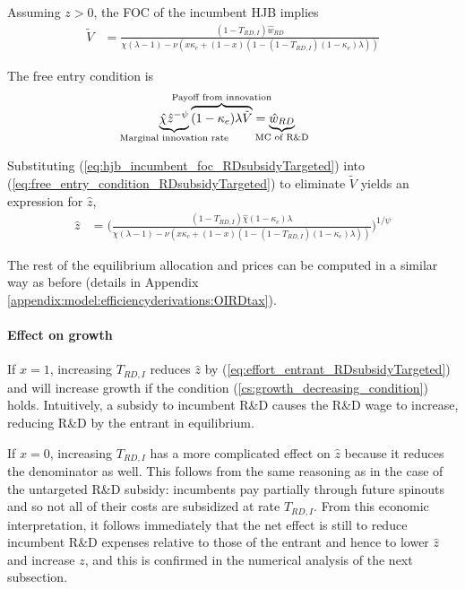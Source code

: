 \documentclass[11pt,english]{article}
\begin{document}
Assuming $z > 0$, the FOC of the incumbent HJB implies
\begin{align}
\tilde{V} &= \frac{(1-T_{RD,I})\hat{w}_{RD}}{\chi(\lambda -1) - \nu (x\kappa_c + (1-x)(1 - (1-T_{RD,I})(1-\kappa_e)\lambda)) } \label{eq:hjb_incumbent_foc_RDsubsidyTargeted}
\end{align}

The free entry condition is
\begin{align}
\underbrace{\hat{\chi} \hat{z}^{-\psi}}_{\mathclap{\text{Marginal innovation rate}}} \overbrace{(1-\kappa_e) \lambda \tilde{V}}^{\mathclap{\text{Payoff from innovation}}} &= \underbrace{\hat{w}_{RD}}_{\mathclap{\text{MC of R\&D}}} \label{eq:free_entry_condition_RDsubsidyTargeted}
\end{align}

Substituting (\ref{eq:hjb_incumbent_foc_RDsubsidyTargeted}) into (\ref{eq:free_entry_condition_RDsubsidyTargeted}) to eliminate $\tilde{V}$ yields an expression for $\hat{z}$, 
\begin{align}
\hat{z} &= \Bigg( \frac{(1-T_{RD,I})\hat{\chi} (1-\kappa_{e}) \lambda}{\chi(\lambda -1) - \nu (x\kappa_c + (1-x)(1 - (1-T_{RD,I})(1-\kappa_e)\lambda)) } \Bigg)^{1/\psi} \label{eq:effort_entrant_RDsubsidyTargeted}
\end{align}

The rest of the equilibrium allocation and prices can be computed in a similar way as before (details in Appendix \ref{appendix:model:efficiencyderivations:OIRDtax}). 






\paragraph{Effect on growth}

If $x = 1$, increasing $T_{RD,I}$ reduces $\hat{z}$ by (\ref{eq:effort_entrant_RDsubsidyTargeted}) and will increase growth if the condition (\ref{cs:growth_decreasing_condition}) holds. Intuitively, a subsidy to incumbent R\&D causes the R\&D wage to increase, reducing R\&D by the entrant in equilibrium. 

If $x = 0$, increasing $T_{RD,I}$ has a more complicated effect on $\hat{z}$ because it reduces the denominator as well. This follows from the same reasoning as in the case of the untargeted R\&D subsidy: incumbents pay partially through future spinouts and so not all of their costs are subsidized at rate $T_{RD,I}$. From this economic interpretation, it follows immediately that the net effect is still to reduce incumbent R\&D expenses relative to those of the entrant and hence to lower $\hat{z}$ and increase $z$, and this is confirmed in the numerical analysis of the next subsection.
\end{document}
